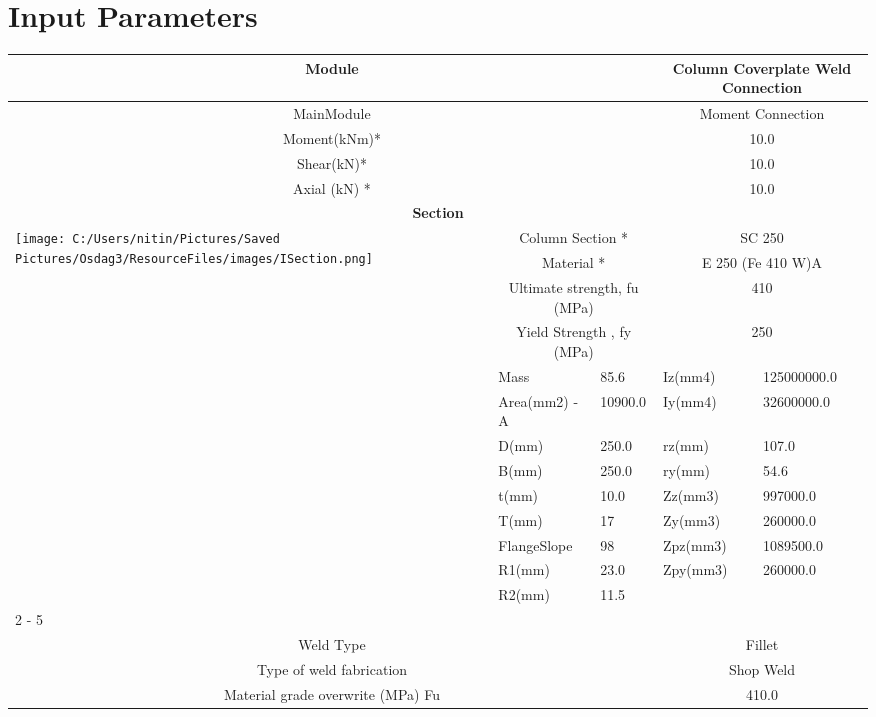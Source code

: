 \documentclass{article}%
\begin{document}
%
\normalsize%
\pagestyle{header}%
\section{Input Parameters}%
\label{sec:InputParameters}%
\renewcommand{\arraystretch}{1.2}%
\begin{longtable}{|p{5cm}|p{2cm}|p{2cm}|p{2cm}|p{5cm}|}%
\hline%
\hline%
\multicolumn{3}{|c|}{Module}&\multicolumn{2}{|c|}{Column Coverplate Weld Connection}\\%
\hline%
\hline%
\multicolumn{3}{|c|}{MainModule}&\multicolumn{2}{|c|}{Moment Connection}\\%
\hline%
\hline%
\multicolumn{3}{|c|}{Moment(kNm)*}&\multicolumn{2}{|c|}{10.0}\\%
\hline%
\hline%
\multicolumn{3}{|c|}{Shear(kN)*}&\multicolumn{2}{|c|}{10.0}\\%
\hline%
\hline%
\multicolumn{3}{|c|}{Axial (kN) *}&\multicolumn{2}{|c|}{10.0}\\%
\hline%
\hline%
\multicolumn{5}{|c|}{\textbf{Section}}\\%
\hline%
\hline%
\multirow{13}{*}{\texttt{[image: C:/Users/nitin/Pictures/Saved Pictures/Osdag3/ResourceFiles/images/ISection.png]}}&\multicolumn{2}{|c|}{Column Section *}&\multicolumn{2}{|c|}{SC 250}\\%
\cline{2%
-%
5}%
&\multicolumn{2}{|c|}{Material *}&\multicolumn{2}{|c|}{E 250 (Fe 410 W)A}\\%
\cline{2%
-%
5}%
&\multicolumn{2}{|c|}{Ultimate strength, fu (MPa)}&\multicolumn{2}{|c|}{410}\\%
\cline{2%
-%
5}%
&\multicolumn{2}{|c|}{Yield Strength , fy (MPa)}&\multicolumn{2}{|c|}{250}\\%
\cline{2%
-%
5}%
&Mass&85.6&Iz(mm4)&125000000.0\\%
\cline{2%
-%
5}%
&Area(mm2) {-} A&10900.0&Iy(mm4)&32600000.0\\%
\cline{2%
-%
5}%
&D(mm)&250.0&rz(mm)&107.0\\%
\cline{2%
-%
5}%
&B(mm)&250.0&ry(mm)&54.6\\%
\cline{2%
-%
5}%
&t(mm)&10.0&Zz(mm3)&997000.0\\%
\cline{2%
-%
5}%
&T(mm)&17&Zy(mm3)&260000.0\\%
\cline{2%
-%
5}%
&FlangeSlope&98&Zpz(mm3)&1089500.0\\%
\cline{2%
-%
5}%
&R1(mm)&23.0&Zpy(mm3)&260000.0\\%
\cline{2%
-%
5}%
&R2(mm)&11.5&&\\%
\cline{2%
-%
5}%
\hline%
\multicolumn{5}{|c|}{\textbf{Weld Details}}\\%
\hline%
\hline%
\multicolumn{3}{|c|}{Weld Type}&\multicolumn{2}{|c|}{Fillet}\\%
\hline%
\hline%
\multicolumn{3}{|c|}{Type of weld fabrication}&\multicolumn{2}{|c|}{Shop Weld}\\%
\hline%
\hline%
\multicolumn{3}{|c|}{Material grade overwrite (MPa) Fu}&\multicolumn{2}{|c|}{410.0}\\%
\hline%
\end{longtable}
\end{document}
